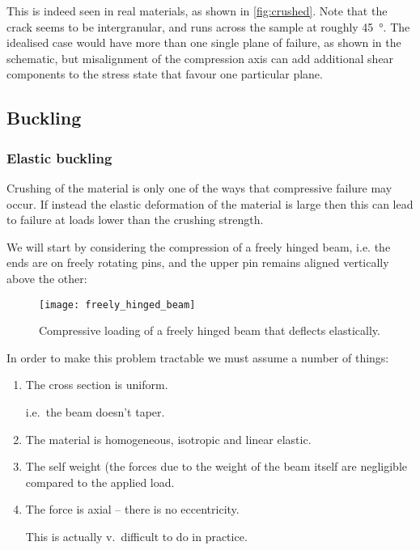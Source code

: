 \FloatBarrier



This is indeed seen in real materials, as shown in \autoref{fig:crushed}. Note that the crack seems to be intergranular, and runs across the sample at roughly \SI{45}{\degree}. The idealised case would have more than one single plane of failure, as shown in the schematic, but misalignment of the compression axis can add additional shear components to the stress state that favour one particular plane.

\subsection{Buckling}
\subsubsection{Elastic buckling}


Crushing of the material is only one of the ways that compressive failure may occur. If instead the elastic deformation of the material is large then this can lead to failure at loads lower than the crushing strength.

We will start by considering the compression of a freely hinged beam, i.e. the ends are on freely rotating pins, and the upper pin remains aligned vertically above the other:

\FloatBarrier
\begin{figure}[h!]
\centering
\texttt{[image: freely\_hinged\_beam]}
\caption{Compressive loading of a freely hinged beam that deflects elastically.\label{fig:free_hinge_deflection}}
\end{figure}
\FloatBarrier


In order to make this problem tractable we must assume a number of things:
\begin{enumerate}
\item The cross section is uniform. \begin{annotation} i.e.\ the beam doesn't taper. \end{annotation}
\item The material is homogeneous, isotropic and linear elastic.
\item The self weight (the forces due to the weight of the beam itself are negligible compared to the applied load.
\item The force is axial -- there is no eccentricity. \begin{annotation}  This is actually v.\ difficult to do in practice.\end{annotation}
\end{enumerate}

